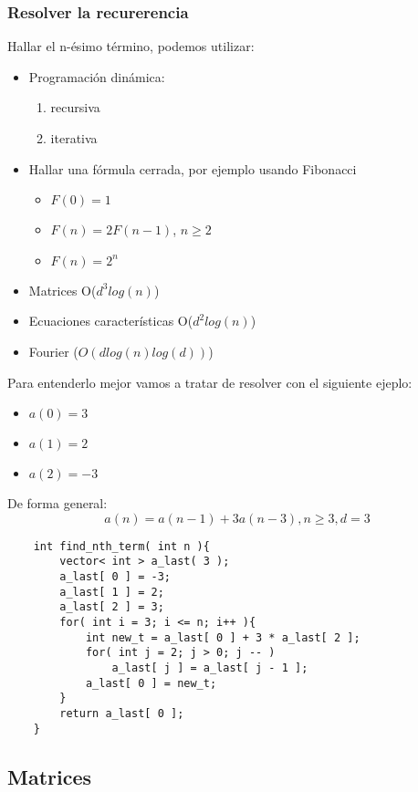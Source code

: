 \subsubsection{Resolver la recurerencia}
Hallar el n-ésimo término, podemos utilizar:
\begin{itemize}
    \item {Programación dinámica:
        \begin{enumerate}
            \item {recursiva}
            \item {iterativa}
        \end{enumerate}}
    \item { Hallar una fórmula cerrada, por ejemplo usando Fibonacci
        \begin{itemize}
            \item {$F(0) = 1$}
            \item {$F(n) = 2F(n-1)$, $n \geq 2$}
            \item {$F(n) = 2^{n}$}
        \end{itemize}}
    \item {Matrices O($d^{3}log(n)$)}
    \item {Ecuaciones características O($d^{2}log(n)$)}
    \item {Fourier ($O(dlog(n)log(d))$)}
\end{itemize}

Para entenderlo mejor vamos a tratar de resolver con el siguiente ejeplo:
\begin{itemize}
    \item {$a(0) = 3$}
    \item {$a(1) = 2$}
    \item {$a(2) = -3$}
\end{itemize}

De forma general:
\[
    a(n) = a(n-1) + 3a(n-3), n \geq 3, d = 3
\]

\begin{lstlisting}
    int find_nth_term( int n ){
        vector< int > a_last( 3 );
        a_last[ 0 ] = -3;
        a_last[ 1 ] = 2;
        a_last[ 2 ] = 3;
        for( int i = 3; i <= n; i++ ){
            int new_t = a_last[ 0 ] + 3 * a_last[ 2 ];
            for( int j = 2; j > 0; j -- )
                a_last[ j ] = a_last[ j - 1 ];
            a_last[ 0 ] = new_t;
        }
        return a_last[ 0 ];
    }
\end{lstlisting}

\subsection{Matrices}
